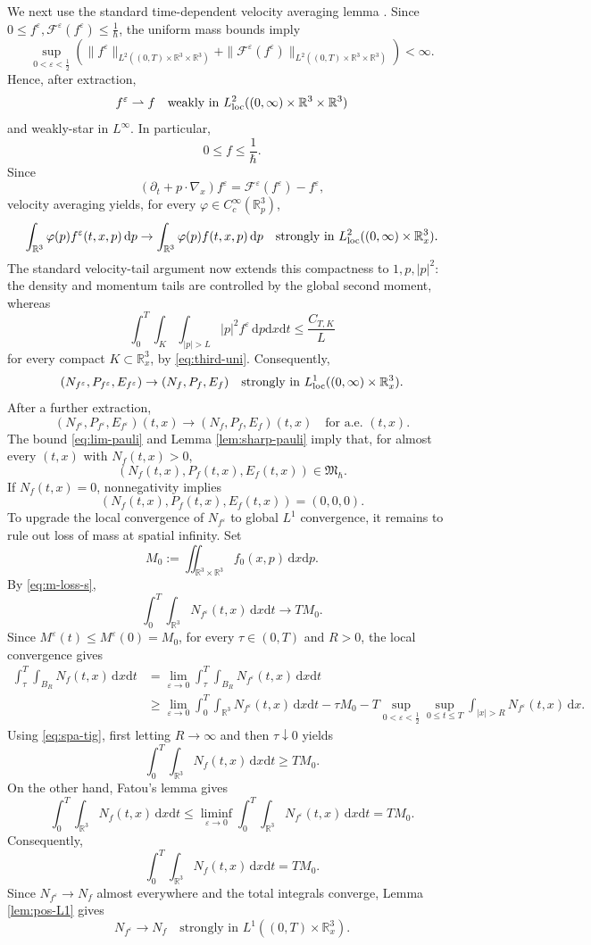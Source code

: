 \documentclass[10pt,reqno]{amsart}
\numberwithin{equation}{section}
\theoremstyle{definition}
\newcommand{\R}{\mathbb R}
\newcommand{\dx}{\mathrm{d}x}
\newcommand{\dpp}{\mathrm{d}p}
\newcommand{\dt}{\mathrm{d}t}
\newcommand{\e}{\varepsilon}
\newcommand{\calF}{\mathcal F}
\newcommand{\bq}{\begin{equation}}
\newcommand{\eq}{\end{equation}}
\newcommand{\lt}{\left}
\newcommand{\rt}{\right}
\newcommand{\pa}{\partial}
\begin{document}
We next use the standard time-dependent velocity averaging lemma \cite{DLM91,GLPS88}.  Since $0\leq f^\e,\calF^\e(f^\e)\leq\frac1\hbar $, the uniform mass bounds imply
\[
 \sup_{0<\e<\frac12}\lt(  \|f^\e\|_{L^2((0,T)\times\R^3\times\R^3)}  +\|\calF^\e(f^\e)\|_{L^2((0,T)\times\R^3\times\R^3)}  \rt)<\infty.
\]
Hence, after extraction,
\bq \label{eq:weak-f}
 f^\e\rightharpoonup f  \quad\text{weakly in }L^2_{\rm loc}((0,\infty)\times\R^3\times\R^3)
\eq
and weakly-star in $L^\infty$.  In particular,
\bq \label{eq:lim-pauli}
 0\leq f\leq\frac1\hbar .
\eq
Since
\[
 (\pa_t+p\cdot\nabla_x)f^\e=\calF^\e(f^\e)-f^\e,
\]
velocity averaging yields, for every $\varphi\in C_c^\infty(\R^3_p)$,
\[
 \int_{\R^3}\varphi(p)f^\e(t,x,p)\,\dpp  \to  \int_{\R^3}\varphi(p)f(t,x,p)\,\dpp  \quad\text{strongly in }L^2_{\rm loc}((0,\infty)\times\R^3_x).
\]
The standard velocity-tail argument now extends this compactness to $1,p,|p|^2$: the density and momentum tails are controlled by the global second moment, whereas
\[
 \int_0^T\int_K\int_{|p|>L}|p|^2f^\e\,\dpp\dx\dt  \leq\frac{C_{T,K}}{L}
\]
for every compact $K\subset\R^3_x$, by \eqref{eq:third-uni}.  Consequently,
\[
 (N_{f^\e},P_{f^\e},E_{f^\e})  \to(N_f,P_f,E_f)  \quad\text{strongly in }L^1_{\rm loc}((0,\infty)\times\R^3_x).
\]
After a further extraction,
\bq \label{eq:mom-ae}
 (N_{f^\e},P_{f^\e},E_{f^\e})(t,x)  \to(N_f,P_f,E_f)(t,x)  \quad\text{for a.e. }(t,x).
\eq
The bound \eqref{eq:lim-pauli} and Lemma \ref{lem:sharp-pauli} imply that, for almost every $(t,x)$ with $N_f(t,x)>0$,
\[
 (N_f(t,x),P_f(t,x),E_f(t,x))\in\mathfrak M_\hbar.
\]
If $N_f(t,x)=0$, nonnegativity implies
\[
 (N_f(t,x),P_f(t,x),E_f(t,x))=(0,0,0).
\]
To upgrade the local convergence of $N_{f^\e}$ to global $L^1$ convergence, it remains to rule out loss of mass at spatial infinity.  Set
\[
 M_0:=\iint_{\R^3\times\R^3}f_0(x,p)\,\dx\dpp.
\]
By \eqref{eq:m-loss-s},
\[
 \int_0^T\int_{\R^3}N_{f^\e}(t,x)\,\dx\dt\to TM_0.
\]
Since $M^\e(t)\leq M^\e(0)=M_0$, for every $\tau\in(0,T)$ and $R>0$, the local convergence gives
\begin{align*}
 \int_\tau^T\int_{B_R}N_f(t,x)\,\dx\dt
 &=\lim_{\e\to0}  \int_\tau^T\int_{B_R}N_{f^\e}(t,x)\,\dx\dt\\
 &\geq  \lim_{\e\to0}  \int_0^T\int_{\R^3}N_{f^\e}(t,x)\,\dx\dt  -\tau M_0   -T\sup_{0<\e<\frac12}\sup_{0\leq t\leq T}  \int_{|x|>R}N_{f^\e}(t,x)\,\dx.
\end{align*}
Using \eqref{eq:spa-tig}, first letting $R\to\infty$ and then $\tau\downarrow0$ yields
\[
 \int_0^T\int_{\R^3}N_f(t,x)\,\dx\dt\geq TM_0.
\]
On the other hand, Fatou's lemma gives
\[
 \int_0^T\int_{\R^3}N_f(t,x)\,\dx\dt  \leq  \liminf_{\e\to0}  \int_0^T\int_{\R^3}N_{f^\e}(t,x)\,\dx\dt  =TM_0.
\]
Consequently,
\[
 \int_0^T\int_{\R^3}N_f(t,x)\,\dx\dt=TM_0.
\]
Since $N_{f^\e}\to N_f$ almost everywhere and the total integrals converge, Lemma \ref{lem:pos-L1} gives
\bq \label{eq:den-glo}
 N_{f^\e}\to N_f  \quad\text{strongly in }L^1((0,T)\times\R^3_x).
\eq
 
\end{document}
